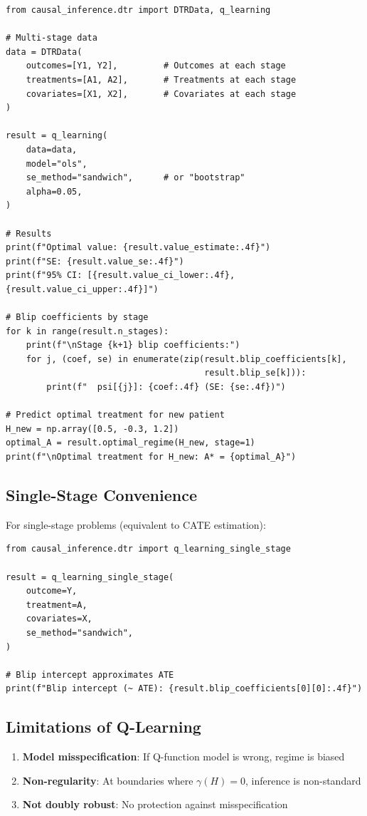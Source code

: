 \begin{verbatim}
from causal_inference.dtr import DTRData, q_learning

# Multi-stage data
data = DTRData(
    outcomes=[Y1, Y2],         # Outcomes at each stage
    treatments=[A1, A2],       # Treatments at each stage
    covariates=[X1, X2],       # Covariates at each stage
)

result = q_learning(
    data=data,
    model="ols",
    se_method="sandwich",      # or "bootstrap"
    alpha=0.05,
)

# Results
print(f"Optimal value: {result.value_estimate:.4f}")
print(f"SE: {result.value_se:.4f}")
print(f"95% CI: [{result.value_ci_lower:.4f}, {result.value_ci_upper:.4f}]")

# Blip coefficients by stage
for k in range(result.n_stages):
    print(f"\nStage {k+1} blip coefficients:")
    for j, (coef, se) in enumerate(zip(result.blip_coefficients[k],
                                       result.blip_se[k])):
        print(f"  psi[{j}]: {coef:.4f} (SE: {se:.4f})")

# Predict optimal treatment for new patient
H_new = np.array([0.5, -0.3, 1.2])
optimal_A = result.optimal_regime(H_new, stage=1)
print(f"\nOptimal treatment for H_new: A* = {optimal_A}")
\end{verbatim}

\subsection{Single-Stage Convenience}

For single-stage problems (equivalent to CATE estimation):

\begin{verbatim}
from causal_inference.dtr import q_learning_single_stage

result = q_learning_single_stage(
    outcome=Y,
    treatment=A,
    covariates=X,
    se_method="sandwich",
)

# Blip intercept approximates ATE
print(f"Blip intercept (~ ATE): {result.blip_coefficients[0][0]:.4f}")
\end{verbatim}

\subsection{Limitations of Q-Learning}

\begin{enumerate}
\item \textbf{Model misspecification}: If Q-function model is wrong, regime is biased
\item \textbf{Non-regularity}: At boundaries where $\gamma(H) = 0$, inference is non-standard
\item \textbf{Not doubly robust}: No protection against misspecification
\end{enumerate}


